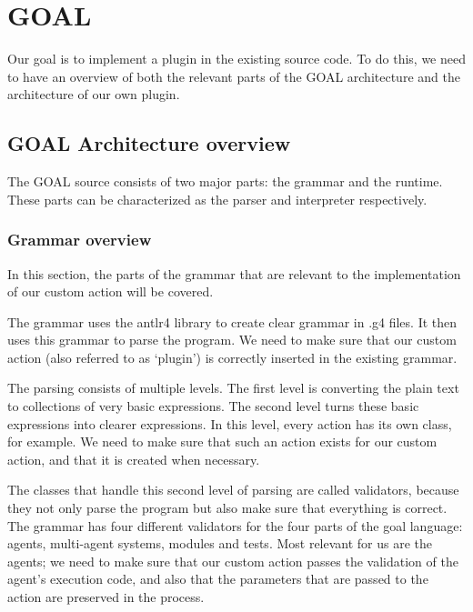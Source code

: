 \section{GOAL}
Our goal is to implement a plugin in the existing source code. To do this, we need to have an overview of both the relevant parts of the GOAL architecture and the architecture of our own plugin.

\subsection{GOAL Architecture overview}
The GOAL source consists of two major parts: the grammar and the runtime. These parts can be characterized as the parser and interpreter respectively.

\subsubsection{Grammar overview}
In this section, the parts of the grammar that are relevant to the implementation of our custom action will be covered. \\ \par

The grammar uses the antlr4 library to create clear grammar in .g4 files. It then uses this grammar to parse the program. We need to make sure that our custom action (also referred to as ‘plugin’) is correctly inserted in the existing grammar. \\ \par

The parsing consists of multiple levels. The first level is converting the plain text to collections of very basic expressions. The second level turns these basic expressions into clearer expressions. In this level, every action has its own class, for example. We need to make sure that such an action exists for our custom action, and that it is created when necessary. \\ \par

The classes that handle this second level of parsing are called validators, because they not only parse the program but also make sure that everything is correct. The grammar has four different validators for the four parts of the goal language: agents, multi-agent systems, modules and tests. Most relevant for us are the agents; we need to make sure that our custom action passes the validation of the agent’s execution code, and also that the parameters that are passed to the action are preserved in the process. \\ \par

